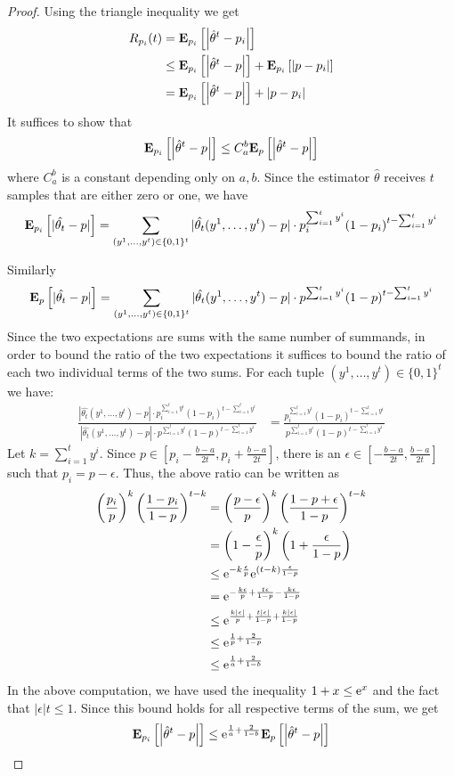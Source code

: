 \begin{proof}
Using the triangle inequality we get
\begin{align*}
R_{p_i}(t) &= \bm{\mathrm{E}}_{p_i} \left[ \left|\hat{\theta}^t-p_i\right| \right]\\
 &\leq \bm{\mathrm{E}}_{p_i} \left[ \left|\hat{\theta}^t-p\right| \right] + \bm{\mathrm{E}}_{p_i} \left[ \left|p-p_i\right| \right]\\
&= \bm{\mathrm{E}}_{p_i} \left[ \left|\hat{\theta}^t-p\right| \right] +\left|p - p_i\right|
\end{align*}
It suffices to show that
\[
\bm{\mathrm{E}}_{p_i} \left[ \left|\hat{\theta}^t-p\right| \right] \leq C_a^b \bm{\mathrm{E}}_{p} \left[ \left|\hat{\theta}^t-p\right| \right]
\]
where $C_a^b$ is a constant depending only on $a,b$.
Since the estimator $\hat{\theta}$ receives $t$ samples that are either zero or one, 
we have
\[
\bm{\mathrm{E}}_{p_i} \left[ |\hat{\theta_t} - p| \right]= \sum_{(y^1,\ldots,y^t)\in
      \{0,1\}^t}|\hat{\theta_t}(y^1,\ldots,y^t) -p| \cdot
    p_i^{\sum_{i=1}^ty^i}(1-p_i)^{t-\sum_{i=1}^ty^i}
\]

Similarly
\[
\bm{\mathrm{E}}_{p} \left[ |\hat{\theta_t} - p| \right]= \sum_{(y^1,\ldots,y^t)\in
      \{0,1\}^t}|\hat{\theta_t}(y^1,\ldots,y^t) -p| \cdot
    p^{\sum_{i=1}^ty^i}(1-p)^{t-\sum_{i=1}^ty^i}
\]
Since the two expectations are sums with the same number of summands, in order to 
bound the ratio of the two expectations it suffices to 
bound the ratio of each two individual terms of the two sums. 
For each tuple $(y^1,\ldots,y^t)\in\{0,1\}^t$ we have:
\begin{align*}
\frac{|\hat{\theta_t}(y^1,\ldots,y^t) -p| \cdot
    p_i^{\sum_{i=1}^ty^i}(1-p_i)^{t-\sum_{i=1}^ty^i}}
    {|\hat{\theta_t}(y^1,\ldots,y^t) -p| \cdot
    p^{\sum_{i=1}^ty^i}(1-p)^{t-\sum_{i=1}^ty^i}} 
    &= \frac{p_i^{\sum_{i=1}^ty^i}(1-p_i)^{t-\sum_{i=1}^ty^i}}
    {p^{\sum_{i=1}^ty^i}(1-p)^{t-\sum_{i=1}^ty^i}}
\end{align*}
Let $k = \sum_{i=1}^ty^i$.
Since $p \in [p_i -\frac{b-a}{2t},p_i + \frac{b-a}{2t}]$, there is an $\epsilon \in [-\frac{b-a}{2t}, \frac{b-a}{2t}]$ such that $p_i = p - \epsilon$. 
Thus, the above ratio can be written as
\begin{align*}
\left(\frac{p_i}{p}\right)^k \left(\frac{1-p_i}{1-p}\right)^{t-k} &= 
\left(\frac{p - \epsilon}{p}\right)^k \left(\frac{1-p + \epsilon}{1-p}\right)^{t-k}\\
&= \left(1 - \frac{\epsilon}{p}\right) ^k \left( 1 + \frac{\epsilon}{1-p}\right)\\
&\leq \mathrm{e}^{-k\frac{\epsilon}{p}} \mathrm{e}^{(t-k)\frac{\epsilon}{1-p}}\\
&= \mathrm{e}^{-\frac{k\epsilon}{p} + \frac{t\epsilon}{1-p} - \frac{k\epsilon}{1-p}}\\
&\leq \mathrm{e}^{\frac{k|\epsilon|}{p} + \frac{t|\epsilon|}{1-p} + \frac{k|\epsilon|}{1-p}}\\
&\leq \mathrm{e}^{\frac{1}{p} + \frac{2}{1-p}}\\
&\leq \mathrm{e}^{\frac{1}{a} + \frac{2}{1-b}}
\end{align*}
In the above computation, we have used the inequality $1+x \leq \mathrm{e}^x$ and the fact that $|\epsilon|t \leq 1$.
Since this bound holds for all respective terms of the sum, we get
\[
\bm{\mathrm{E}}_{p_i} \left[ \left|\hat{\theta}^t-p\right| \right] \leq \mathrm{e}^{\frac{1}{a} + \frac{2}{1-b}} \bm{\mathrm{E}}_{p} \left[ \left|\hat{\theta}^t-p\right| \right]
\]
\end{proof}

